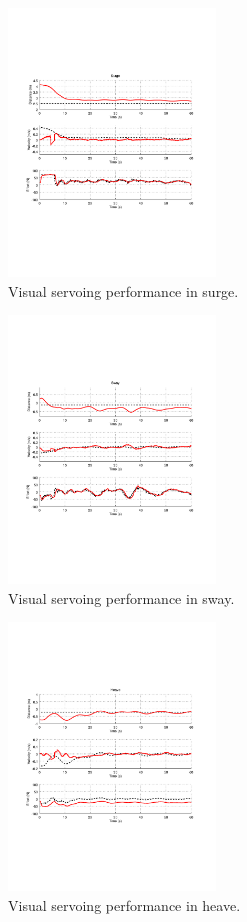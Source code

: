 \documentclass[conference, letterpaper]{IEEEtran}
\begin{document}
\begin{figure}[!ht]
	\centering
    \includegraphics[width=0.49\textwidth, trim={1.6cm 6.9cm 2.3cm 6.7cm}]{./fig/vs_surge_emb.pdf}
    \caption{Visual servoing performance in surge.}
	\label{fig:vs_surge}
\end{figure}
\begin{figure}[!ht]
	\centering
    \includegraphics[width=0.49\textwidth, trim={1.6cm 6.9cm 2.3cm 6.7cm}]{./fig/vs_sway_emb.pdf}
    \caption{Visual servoing performance in sway.}
	\label{fig:vs_sway}
\end{figure}
\begin{figure}[!ht]
	\centering
    \includegraphics[width=0.49\textwidth, trim={1.6cm 6.9cm 2.3cm 6.7cm}]{./fig/vs_heave_emb.pdf}
    \caption{Visual servoing performance in heave.}
	\label{fig:vs_heave}
\end{figure}
\end{document}
